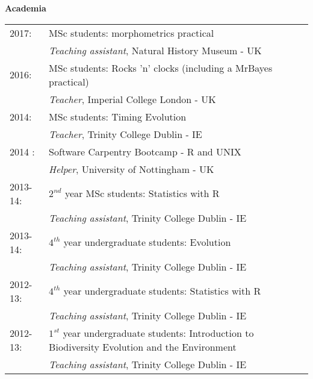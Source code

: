 \documentclass[10pt,a4paper]{article}
\begin{document}
{\raggedright\textbf{Academia}\\[1.5ex]
\begin{tabular}{ll}
2017: & MSc students: morphometrics practical\\
& \textit{Teaching assistant}, Natural History Museum - UK \\
2016: & MSc students: Rocks 'n' clocks (including a MrBayes practical)\\
& \textit{Teacher}, Imperial College London - UK \\
2014: & MSc students: Timing Evolution \\
& \textit{Teacher}, Trinity College Dublin - IE \\
2014 : & Software Carpentry Bootcamp - R and UNIX \\
& \textit{Helper}, University of Nottingham - UK \\
2013-14: & $2^{nd}$ year MSc students: Statistics with R \\
& \textit{Teaching assistant}, Trinity College Dublin - IE \\
2013-14: & $4^{th}$ year undergraduate students: Evolution\\
& \textit{Teaching assistant}, Trinity College Dublin - IE\\
2012-13: & $4^{th}$ year undergraduate students: Statistics with R\\
& \textit{Teaching assistant}, Trinity College Dublin - IE\\
2012-13: & $1^{st}$ year undergraduate students: Introduction to Biodiversity Evolution and the Environment\\
& \textit{Teaching assistant}, Trinity College Dublin - IE\\
\end{tabular}

\bigskip

}
\end{document}
